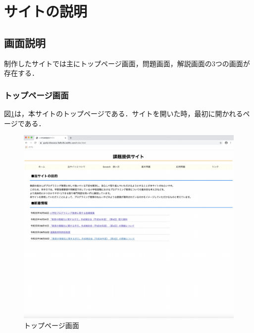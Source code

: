 \newpage

\section{\rm サイトの説明}
\subsection{画面説明}
制作したサイトでは主にトップページ画面，問題画面，解説画面の3つの画面が存在する．

\subsubsection{トップページ画面}
図\ref{fig:topgamen1}は，本サイトのトップページである．サイトを開いた時，最初に開かれるページである．

\begin{figure}[h]
\begin{center}
\includegraphics[width=15cm]{toppage.pdf}
\caption{トップページ画面}
\label{fig:topgamen1}
\end{center}
\end{figure}

\newpage
